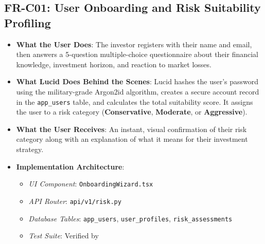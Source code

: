 \subsection{FR-C01: User Onboarding and Risk Suitability Profiling}
\begin{itemize}
    \item \textbf{What the User Does}: The investor registers with their name and email, then answers a 5-question multiple-choice questionnaire about their financial knowledge, investment horizon, and reaction to market losses.
    \item \textbf{What Lucid Does Behind the Scenes}: Lucid hashes the user's password using the military-grade Argon2id algorithm, creates a secure account record in the \texttt{app\_users} table, and calculates the total suitability score. It assigns the user to a risk category (\textbf{Conservative}, \textbf{Moderate}, or \textbf{Aggressive}).
    \item \textbf{What the User Receives}: An instant, visual confirmation of their risk category along with an explanation of what it means for their investment strategy.
    \item \textbf{Implementation Architecture}:
    \begin{itemize}
        \item \textit{UI Component}: \texttt{OnboardingWizard.tsx}
        \item \textit{API Router}: \texttt{api/v1/risk.py}
        \item \textit{Database Tables}: \texttt{app\_users}, \texttt{user\_profiles}, \texttt{risk\_assessments}
        \item \textit{Test Suite}: Verified by 
    \end{itemize}
\end{itemize}

